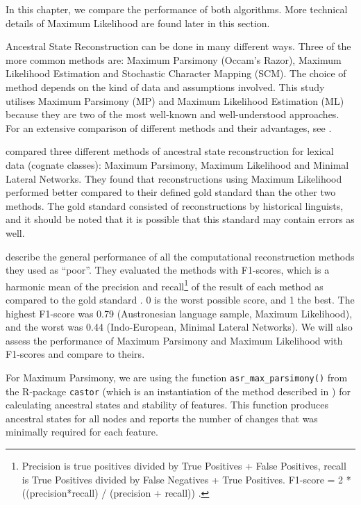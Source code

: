 \documentclass[draft,10pt]{article} %
\begin{document}
In this chapter, we compare the performance of both algorithms. More technical details of Maximum Likelihood are found later in this section.
    
Ancestral State Reconstruction can be done in many different ways. Three of the more common methods are: Maximum Parsimony (Occam's Razor), Maximum Likelihood Estimation and Stochastic Character Mapping (SCM). The choice of method depends on the kind of data and assumptions involved. This study utilises Maximum Parsimony (MP) and Maximum Likelihood Estimation (ML) because they are two of the most well-known and well-understood approaches. For an extensive comparison of different methods and their advantages, see \citet{joy2016ancestral}. 

\citet{jager2018using} compared three different methods of ancestral state reconstruction for lexical data (cognate classes): Maximum Parsimony, Maximum Likelihood and Minimal Lateral Networks. They found that reconstructions using Maximum Likelihood performed better compared to their defined gold standard than the other two methods. The gold standard consisted of reconstructions by historical linguists, and it should be noted that it is possible that this standard may contain errors as well.

\citet{jager2018using} describe the general performance of all the computational reconstruction methods they used as ``poor''. They evaluated the methods with F1-scores, which is a harmonic mean of the precision and recall\footnote{Precision is true positives divided by True Positives + False Positives, recall is True Positives divided by False Negatives + True Positives. F1-score = 2 * ((precision*recall) / (precision + recall)) \citep{van1979information}.} of the result of each method as compared to the gold standard \citep[133]{van1979information}. 0 is the worst possible score, and 1 the best. The highest F1-score was 0.79 (Austronesian language sample, Maximum Likelihood), and the worst was 0.44 (Indo-European, Minimal Lateral Networks). We will also assess the performance of Maximum Parsimony and Maximum Likelihood with F1-scores and compare to theirs.

For Maximum Parsimony, we are using the function \texttt{asr\_max\_parsimony()} from the R-package \texttt{castor} \citep{louca2017efficient} (which is an instantiation of the method described in \citet{sankoff1975minimal}) for calculating ancestral states and stability of features. This function produces ancestral states for all nodes and reports the number of changes that was minimally required for each feature. 
\end{document}
